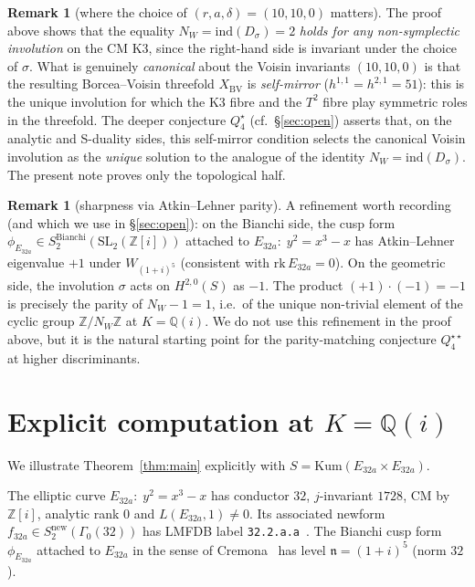 \documentclass[11pt,a4paper]{article}
\theoremstyle{plain}
\theoremstyle{definition}
\newtheorem{remark}[theorem]{Remark}
\newcommand{\Q}{\mathbb{Q}}
\newcommand{\Z}{\mathbb{Z}}
\newcommand{\ind}{\mathrm{ind}}
\newcommand{\NW}{N_{W}}
\begin{document}
\begin{remark}[where the choice of $(r,a,\delta)=(10,10,0)$ matters]
\label{rmk:why-canonical}
The proof above shows that the equality $\NW=\ind(D_{\sigma})=2$
\emph{holds for any non-symplectic involution} on the CM K3, since the
right-hand side is invariant under the choice of $\sigma$. What is
genuinely \emph{canonical} about the Voisin invariants $(10,10,0)$ is
that the resulting Borcea--Voisin threefold $X_{\mathrm{BV}}$ is
\emph{self-mirror} ($h^{1,1}=h^{2,1}=51$): this is the unique involution
for which the K3 fibre and the $T^{2}$ fibre play symmetric roles in
the threefold. The deeper conjecture $Q_{4}^{\star}$ (cf.\
\S\ref{sec:open}) asserts that, on the analytic and S-duality
sides, this self-mirror condition selects the canonical Voisin
involution as the \emph{unique} solution to the analogue of the
identity $\NW=\ind(D_{\sigma})$. The present note proves only the
topological half.\end{remark}

\begin{remark}[sharpness via Atkin--Lehner parity]\label{rmk:sharp}
A refinement worth recording (and which we use in \S\ref{sec:open}):
on the Bianchi side, the cusp form
$\phi_{E_{32a}}\in S_{2}^{\mathrm{Bianchi}}(\mathrm{SL}_{2}(\Z[i]))$
attached to $E_{32a}:\;y^{2}=x^{3}-x$ has Atkin--Lehner eigenvalue $+1$
under $W_{(1+i)^{5}}$ (consistent with $\mathrm{rk}\,E_{32a}=0$). On the
geometric side, the involution $\sigma$ acts on $H^{2,0}(S)$ as $-1$.
The product $(+1)\cdot(-1)=-1$ is precisely the parity of $\NW-1=1$, i.e.\
of the unique non-trivial element of the cyclic group $\Z/N_{W}\Z$ at
$K=\Q(i)$. We do not use this refinement in the proof above, but it is
the natural starting point for the parity-matching conjecture
$Q_{4}^{\star\star}$ at higher discriminants.
\end{remark}

\section{Explicit computation at $K=\Q(i)$}
\label{sec:explicit}

We illustrate Theorem~\ref{thm:main} explicitly with
$S=\mathrm{Kum}(E_{32a}\times E_{32a})$.

The elliptic curve $E_{32a}:\;y^{2}=x^{3}-x$ has conductor $32$,
$j$-invariant $1728$, CM by $\Z[i]$, analytic rank $0$ and
$L(E_{32a},1)\neq 0$. Its associated newform
$f_{32a}\in S_{2}^{\mathrm{new}}(\Gamma_{0}(32))$ has LMFDB label
\texttt{32.2.a.a}~\cite{LMFDB}. The Bianchi cusp form $\phi_{E_{32a}}$
attached to $E_{32a}$ in the sense of Cremona~\cite{Cremona1992} has
level $\mathfrak n=(1+i)^{5}$ (norm $32$).
\end{document}
